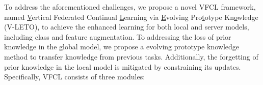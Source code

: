 To address the aforementioned challenges, we propose a novel VFCL framework, named \underline{V}ertical Federated Continual \underline{L}earning via \underline{E}volving Pro\underline{t}otype Kn\underline{o}wledge (V-LETO), to achieve the enhanced learning for both local and server models, including class and feature augmentation. 
To addressing the loss of prior knowledge in the global model, we propose a evolving prototype knowledge method to transfer knowledge from previous tasks. Additionally, the forgetting of prior knowledge in the local model is mitigated by constraining its updates.
Specifically, VFCL consists of three modules: 
